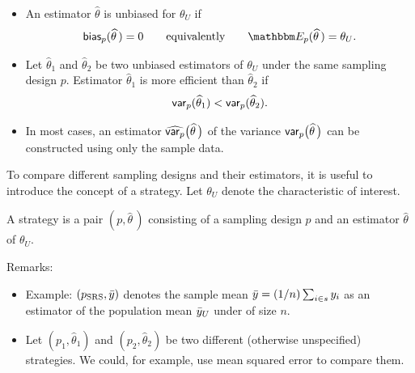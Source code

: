 \documentclass{my_eth_beamer}
\numberwithin{equation}{section}
\begin{document}
\begin{frame}
    \begin{itemize}
    \setlength{\itemsep}{10pt}
        \item An estimator $\widehat{\theta}$ is \alert{unbiased} for
            $\theta_U$ if
            \begin{equation*}
                \bias(\widehat{\theta}\,) = 0
                \qquad \text{equivalently} \qquad
                \EE(\widehat{\theta}\,) = \theta_U.
            \end{equation*}
        \item Let $\widehat{\theta}_1$ and $\widehat{\theta}_2$ be two unbiased
            estimators of $\theta_U$ under the same sampling design $p$.
            Estimator $\widehat{\theta}_1$ is \alert{more efficient} than
            $\widehat{\theta}_2$ if
            \begin{equation*}
                \mathsf{var}_p(\widehat{\theta}_1) < \mathsf{var}_p(\widehat{\theta}_2).
            \end{equation*}
        \item In most cases, an \alert{estimator}
            $\widehat{\mathsf{var}_p}\big(\widehat{\theta}\,\big)$ of the variance
            $\mathsf{var}_p\big(\widehat{\theta}\,\big)$ can be constructed using only
            the sample data.
    \end{itemize}
\end{frame}

\begin{frame}
    To compare different sampling designs and their estimators, it is useful
    to introduce the concept of a strategy. Let $\theta_U$ denote the
    characteristic of interest.
    \vspace{0.25em}
    \begin{Def}[Strategy]\label{def:strategy}
        \vspace{-0.25em}
        A \alert{strategy} is a pair $(p, \widehat{\theta}\,)$ consisting of
        a sampling design $p$ and an estimator $\widehat{\theta}$ of
        $\theta_U$.
    \end{Def}
    \vspace{0.25em}
    Remarks:
    \vspace{0.25em}
    \begin{itemize}
    \setlength{\itemsep}{8pt}
        \item Example: $(p_{\mathrm{SRS}}, \bar{y})$ denotes the sample mean
            $\bar{y} = (1/n) \sum_{i \in s} y_i$ as an estimator of the
            population mean $\bar{y}_U$ under \SRS of size $n$.
        \item Let $(p_1, \widehat{\theta}_1)$ and
            $(p_2, \widehat{\theta}_2)$ be two different (otherwise
            unspecified) strategies. We could, for example, use mean squared
            error to compare them.
    \end{itemize}
\end{frame}
\end{document}
